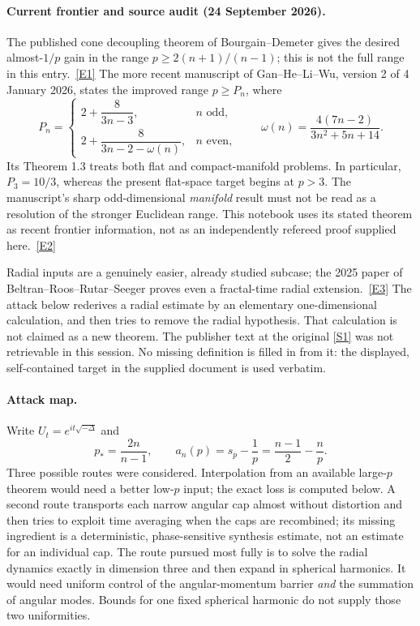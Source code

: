 \documentclass[11pt]{article}
\newcommand{\sref}[2]{\hyperlink{source:#1:#2}{[S#2]}}
\newcommand{\eref}[2]{\hyperlink{extra:#1:#2}{[E#2]}}
\begin{document}
	\paragraph{Current frontier and source audit (24 September 2026).}
	The published cone decoupling theorem of Bourgain--Demeter gives the desired
	almost-$1/p$ gain in the range $p\geq 2(n+1)/(n-1)$; this is not the full
	range in this entry.\ \eref{30004844}{1}
	The more recent manuscript of Gan--He--Li--Wu, version 2 of 4 January 2026,
	states the improved range $p\geq P_n$, where
	\begin{equation}\label{ra30004844:frontier}
		P_n=\begin{cases}
			2+\dfrac{8}{3n-3},&n\text{ odd},\\[4pt]
			2+\dfrac{8}{3n-2-\omega(n)},&n\text{ even},
		\end{cases}
		\qquad \omega(n)=\frac{4(7n-2)}{3n^2+5n+14}.
	\end{equation}
	Its Theorem 1.3 treats both flat and compact-manifold problems. In particular,
	$P_3=10/3$, whereas the present flat-space target begins at $p>3$.
	The manuscript's sharp odd-dimensional \emph{manifold} result must not be
	read as a resolution of the stronger Euclidean range. This notebook uses
	its stated theorem as recent frontier information, not as an independently
	refereed proof supplied here.\ \eref{30004844}{2}
	
	Radial inputs are a genuinely easier, already studied subcase; the 2025
	paper of Beltran--Roos--Rutar--Seeger proves even a fractal-time radial
	extension.\ \eref{30004844}{3} The attack below rederives a radial estimate by
	an elementary one-dimensional calculation, and then tries to remove the
	radial hypothesis. That calculation is not claimed as a new theorem.
	The publisher text at the original \sref{30004844}{1} was not retrievable in
	this session. No missing definition is filled in from it: the displayed,
	self-contained target in the supplied document is used verbatim.
	
	\paragraph{Attack map.}
	Write $U_t=e^{it\sqrt{-\Delta}}$ and
	\[
	p_* =\frac{2n}{n-1},\qquad
	a_n(p)=s_p-\frac1p=\frac{n-1}{2}-\frac np.
	\]
	Three possible routes were considered. Interpolation from an available
	large-$p$ theorem would need a better low-$p$ input; the exact loss is
	computed below. A second route transports each narrow angular cap almost
	without distortion and then tries to exploit time averaging when the caps
	are recombined; its missing ingredient is a deterministic, phase-sensitive
	synthesis estimate, not an estimate for an individual cap. The route
	pursued most fully is to solve the radial dynamics exactly in dimension
	three and then expand in spherical harmonics. It would need uniform
	control of the angular-momentum barrier \emph{and} the summation of angular
	modes. Bounds for one fixed spherical harmonic do not supply those two
	uniformities.
	
\end{document}
